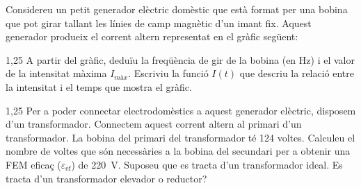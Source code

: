 Considereu un petit generador elèctric domèstic que està format per una bobina que pot girar tallant les línies de camp magnètic d'un imant fix. Aquest generador produeix el corrent altern representat en el gràfic següent:


\begin{apartat}{1,25}
A partir del gràfic, deduïu la freqüència de gir de la bobina (en Hz) i el valor de la intensitat màxima $I_\textit{màx}$. Escriviu la funció $I(t)$ que descriu la relació entre la intensitat i el temps que mostra el gràfic.
\end{apartat}

\begin{apartat}{1,25}
Per a poder connectar electrodomèstics a aquest generador elèctric, disposem d'un transformador. Connectem aquest corrent altern al primari d'un transformador. La bobina del primari del transformador té 124 voltes. Calculeu el nombre de voltes que són necessàries a la bobina del secundari per a obtenir una FEM eficaç ($\varepsilon_\mathrm{ef}$) de 220~V. Suposeu que es tracta d'un transformador ideal. Es tracta d'un transformador elevador o reductor?
\end{apartat}
